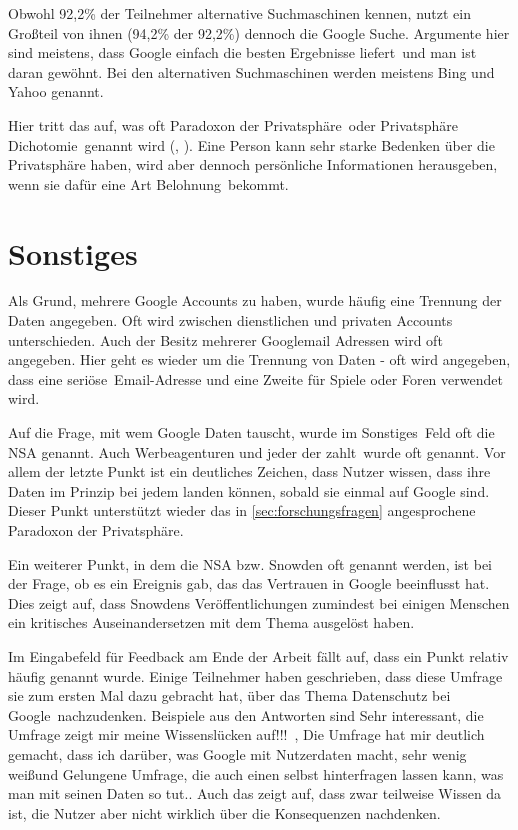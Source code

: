 Obwohl 92,2\% der Teilnehmer alternative Suchmaschinen kennen, nutzt ein Großteil von ihnen (94,2\% der 92,2\%) dennoch die Google Suche. Argumente hier sind meistens, dass Google \glqq einfach die besten Ergebnisse liefert\grqq\ und \glqq man ist daran gewöhnt\grqq . Bei den alternativen Suchmaschinen werden meistens Bing und Yahoo genannt.

Hier tritt das auf, was oft \glqq Paradoxon der Privatsphäre\grqq\ oder \glqq Privatsphäre Dichotomie\grqq\ genannt wird (\citet{lbs2006}, \citet{privacyparadox2006}). Eine Person kann sehr starke Bedenken über die Privatsphäre haben, wird aber dennoch persönliche Informationen herausgeben, wenn sie dafür eine Art \glqq Belohnung\grqq\ bekommt.

\section{Sonstiges}
Als Grund, mehrere Google Accounts zu haben, wurde häufig eine Trennung der Daten angegeben. Oft wird zwischen dienstlichen und privaten Accounts unterschieden. Auch der Besitz mehrerer Googlemail Adressen wird oft angegeben. Hier geht es wieder um die Trennung von Daten - oft wird angegeben, dass eine \glqq seriöse\grqq\ Email-Adresse und eine Zweite für Spiele oder Foren verwendet wird.

Auf die Frage, mit wem Google Daten tauscht, wurde im \glqq Sonstiges\grqq\ Feld oft die NSA genannt. Auch Werbeagenturen und \glqq jeder der zahlt\grqq\ wurde oft genannt. Vor allem der letzte Punkt ist ein deutliches Zeichen, dass Nutzer wissen, dass ihre Daten im Prinzip bei jedem landen können, sobald sie einmal auf Google sind. Dieser Punkt unterstützt wieder das in \ref{sec:forschungsfragen} angesprochene Paradoxon der Privatsphäre. 

Ein weiterer Punkt, in dem die NSA bzw. Snowden oft genannt werden, ist bei der Frage, ob es ein Ereignis gab, das das Vertrauen in Google beeinflusst hat. Dies zeigt auf, dass Snowdens Veröffentlichungen zumindest bei einigen Menschen ein kritisches Auseinandersetzen mit dem Thema ausgelöst haben.

Im Eingabefeld für Feedback am Ende der Arbeit fällt auf, dass ein Punkt relativ häufig genannt wurde. Einige Teilnehmer haben geschrieben, dass diese Umfrage sie zum ersten Mal dazu gebracht hat, über das Thema \glqq Datenschutz bei Google\grqq\ nachzudenken. Beispiele aus den Antworten sind \glqq Sehr interessant, die Umfrage zeigt mir meine Wissenslücken auf!!!\grqq\ , \glqq Die Umfrage hat mir deutlich gemacht, dass ich darüber, was Google mit Nutzerdaten macht, sehr wenig weiß\grqq und \glqq Gelungene Umfrage, die auch einen selbst hinterfragen lassen kann, was man mit seinen Daten so tut.\grqq . Auch das zeigt auf, dass zwar teilweise Wissen da ist, die Nutzer aber nicht wirklich über die Konsequenzen nachdenken.